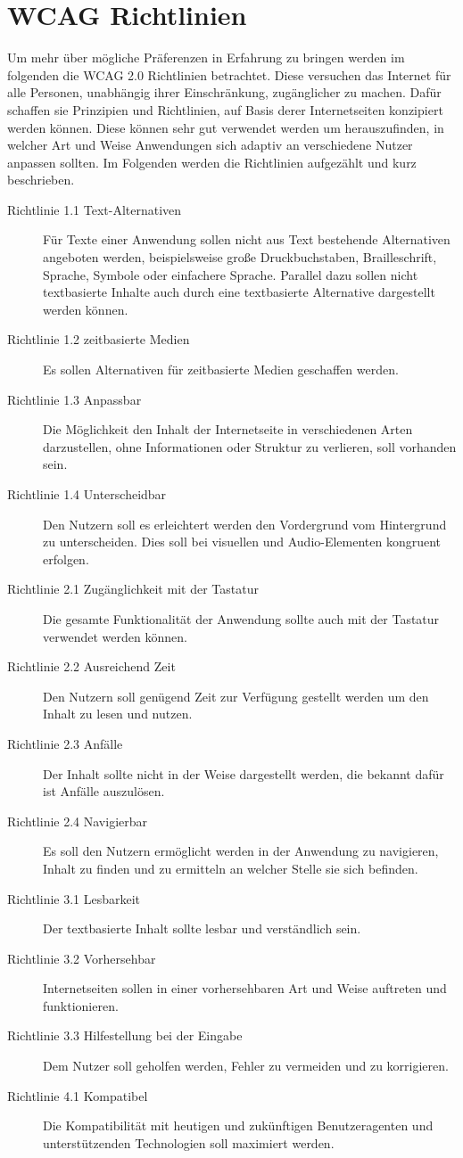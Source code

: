 \documentclass[12pt, paper=a4, bibtotoc, toc=listof, headsepline=true]{scrreprt}
\begin{document}
\section{WCAG Richtlinien}
Um mehr über mögliche Präferenzen in Erfahrung zu bringen werden im folgenden die \ac{WCAG 2.0} Richtlinien betrachtet. Diese versuchen das Internet für alle Personen, unabhängig ihrer Einschränkung, zugänglicher zu machen. Dafür schaffen sie Prinzipien und Richtlinien, auf Basis derer Internetseiten konzipiert werden können. Diese können sehr gut verwendet werden um herauszufinden, in welcher Art und Weise Anwendungen sich adaptiv an verschiedene Nutzer anpassen sollten. Im Folgenden werden die Richtlinien aufgezählt und kurz beschrieben\cite{wcag}.
\begin{description}
	\item [Richtlinie 1.1 Text-Alternativen] Für Texte einer Anwendung sollen nicht aus Text bestehende Alternativen angeboten werden, beispielsweise große Druckbuchstaben, Brailleschrift, Sprache, Symbole oder einfachere Sprache. Parallel dazu sollen nicht textbasierte Inhalte auch durch eine textbasierte Alternative dargestellt werden können.
	\item[Richtlinie 1.2 zeitbasierte Medien] Es sollen Alternativen für zeitbasierte Medien geschaffen werden.
	\item[Richtlinie 1.3 Anpassbar] Die Möglichkeit den Inhalt der Internetseite in verschiedenen Arten darzustellen, ohne Informationen oder Struktur zu verlieren, soll vorhanden sein.
	\item[Richtlinie 1.4 Unterscheidbar] Den Nutzern soll es erleichtert werden den Vordergrund vom Hintergrund zu unterscheiden. Dies soll bei visuellen und Audio-Elementen kongruent erfolgen. 
	\item[Richtlinie 2.1 Zugänglichkeit mit der Tastatur] Die gesamte Funktionalität der Anwendung sollte auch mit der Tastatur verwendet werden können.	
	\item[Richtlinie 2.2 Ausreichend Zeit] Den Nutzern soll genügend Zeit zur Verfügung gestellt werden um den Inhalt zu lesen und nutzen.
	\item[Richtlinie 2.3 Anfälle] Der Inhalt sollte nicht in der Weise dargestellt werden, die bekannt dafür ist Anfälle auszulösen.
	\item[Richtlinie 2.4 Navigierbar] Es soll den Nutzern ermöglicht werden in der Anwendung zu navigieren, Inhalt zu finden und zu ermitteln an welcher Stelle sie sich befinden.
	\item[Richtlinie 3.1 Lesbarkeit] Der textbasierte Inhalt sollte lesbar und verständlich sein.	
	\item[Richtlinie 3.2 Vorhersehbar] Internetseiten sollen in einer vorhersehbaren Art und Weise auftreten und funktionieren.
	\item[Richtlinie 3.3 Hilfestellung bei der Eingabe] Dem Nutzer soll geholfen werden, Fehler zu vermeiden und zu korrigieren.
	\item[Richtlinie 4.1 Kompatibel] Die Kompatibilität mit heutigen und zukünftigen Benutzeragenten und unterstützenden Technologien soll maximiert werden.
\end{description}
\end{document}
